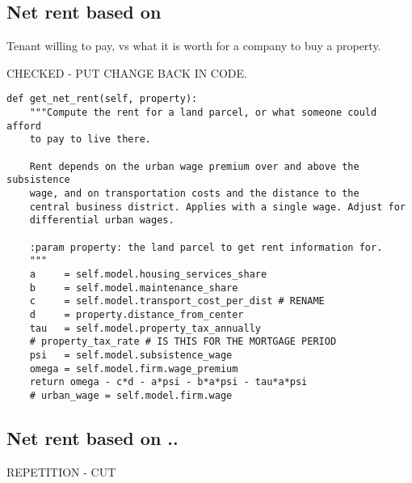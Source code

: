  
\subsection{Net rent based on}
Tenant willing to pay, vs what it is worth for a company to buy a property.

CHECKED - PUT CHANGE BACK IN CODE.

\begin{lstlisting}
def get_net_rent(self, property):
    """Compute the rent for a land parcel, or what someone could afford
    to pay to live there. 

    Rent depends on the urban wage premium over and above the subsistence
    wage, and on transportation costs and the distance to the
    central business district. Applies with a single wage. Adjust for
    differential urban wages.

    :param property: the land parcel to get rent information for.
    """
    a     = self.model.housing_services_share
    b     = self.model.maintenance_share
    c     = self.model.transport_cost_per_dist # RENAME
    d     = property.distance_from_center 
    tau   = self.model.property_tax_annually 
    # property_tax_rate # IS THIS FOR THE MORTGAGE PERIOD
    psi   = self.model.subsistence_wage
    omega = self.model.firm.wage_premium 
    return omega - c*d - a*psi - b*a*psi - tau*a*psi
    # urban_wage = self.model.firm.wage
\end{lstlisting}


\subsection{Net rent based on ..}

REPETITION - CUT



